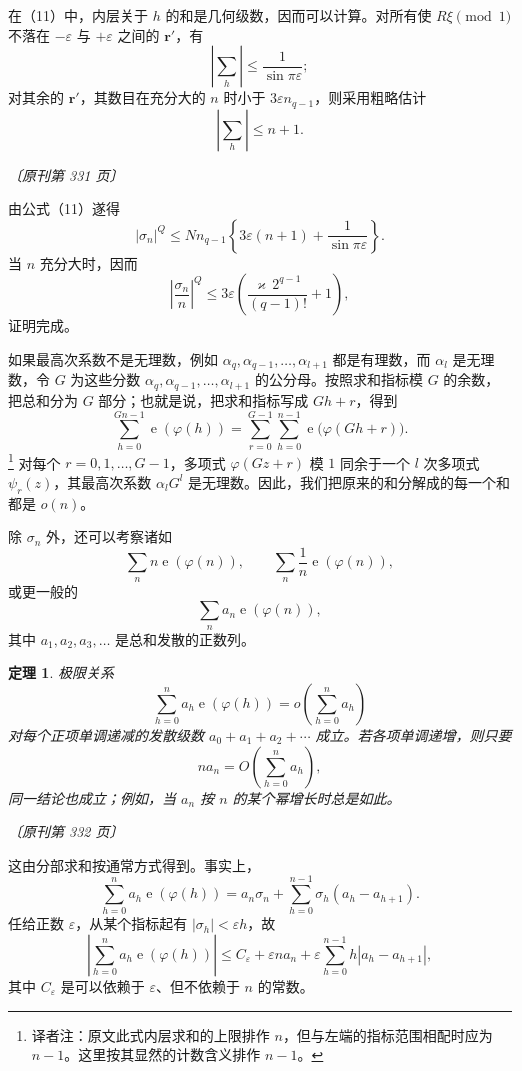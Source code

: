 \documentclass[UTF8,11pt,a4paper,fontset=none]{ctexart}
\theoremstyle{weylthm}
\newtheorem{theorem}{定理}
\newcommand{\e}{\operatorname{e}}
\newcommand{\origpage}[1]{%
  \par\vspace{0.7em}\noindent\hfill{\small\itshape〔原刊第 #1 页〕}\par\vspace{0.25em}}
\newcommand{\transnote}[1]{\footnote{译者注：#1}}
\begin{document}
在（11）中，内层关于 \(h\) 的和是几何级数，因而可以计算。对所有使
\(R\xi\pmod1\) 不落在 \(-\varepsilon\) 与 \(+\varepsilon\) 之间的
\(\mathbf r'\)，有
\[
 \left|\sum_h\right|\leq\frac1{\sin\pi\varepsilon};
\]
对其余的 \(\mathbf r'\)，其数目在充分大的 \(n\) 时小于
\(3\varepsilon n_{q-1}\)，则采用粗略估计
\[
 \left|\sum_h\right|\leq n+1.
\]

\origpage{331}

由公式（11）遂得
\[
 |\sigma_n|^Q
 \leq Nn_{q-1}
 \left\{3\varepsilon(n+1)+\frac1{\sin\pi\varepsilon}\right\}.
\]
当 \(n\) 充分大时，因而
\[
 \left|\frac{\sigma_n}{n}\right|^Q
 \leq 3\varepsilon
 \left(\frac{\varkappa\,2^{q-1}}{(q-1)!}+1\right),
\]
证明完成。

如果最高次系数不是无理数，例如
\(\alpha_q,\alpha_{q-1},\ldots,\alpha_{l+1}\) 都是有理数，而
\(\alpha_l\) 是无理数，令 \(G\) 为这些分数
\(\alpha_q,\alpha_{q-1},\ldots,\alpha_{l+1}\) 的公分母。按照求和指标模
\(G\) 的余数，把总和分为 \(G\) 部分；也就是说，把求和指标写成
\(Gh+r\)，得到
\[
 \sum_{h=0}^{Gn-1}\e(\varphi(h))
 =\sum_{r=0}^{G-1}\sum_{h=0}^{n-1}
   \e\bigl(\varphi(Gh+r)\bigr).
\]
\transnote{原文此式内层求和的上限排作 \(n\)，但与左端的指标范围相配时应为 \(n-1\)。这里按其显然的计数含义排作 \(n-1\)。}
对每个 \(r=0,1,\ldots,G-1\)，多项式 \(\varphi(Gz+r)\) 模 \(1\) 同余于一个
\(l\) 次多项式 \(\psi_r(z)\)，其最高次系数
\(\alpha_lG^l\) 是无理数。因此，我们把原来的和分解成的每一个和都是
\(o(n)\)。

除 \(\sigma_n\) 外，还可以考察诸如
\[
 \sum_n n\e(\varphi(n)),
 \qquad
 \sum_n\frac1n\e(\varphi(n)),
\]
或更一般的
\[
 \sum_n a_n\e(\varphi(n)),
\]
其中 \(a_1,a_2,a_3,\ldots\) 是总和发散的正数列。

\begin{theorem}
极限关系
\[
 \sum_{h=0}^{n}a_h\e(\varphi(h))
 =o\!\left(\sum_{h=0}^{n}a_h\right)
\]
对每个正项单调递减的发散级数
\(a_0+a_1+a_2+\cdots\) 成立。若各项单调递增，则只要
\[
 na_n=O\!\left(\sum_{h=0}^{n}a_h\right),
\]
同一结论也成立；例如，当 \(a_n\) 按 \(n\) 的某个幂增长时总是如此。
\end{theorem}

\origpage{332}

这由分部求和按通常方式得到。事实上，
\[
 \sum_{h=0}^{n}a_h\e(\varphi(h))
 =a_n\sigma_n+
 \sum_{h=0}^{n-1}\sigma_h(a_h-a_{h+1}).
\]
任给正数 \(\varepsilon\)，从某个指标起有
\(|\sigma_h|<\varepsilon h\)，故
\[
 \left|\sum_{h=0}^{n}a_h\e(\varphi(h))\right|
 \leq C_{\varepsilon}+\varepsilon na_n
 +\varepsilon\sum_{h=0}^{n-1}h|a_h-a_{h+1}|,
\]
其中 \(C_{\varepsilon}\) 是可以依赖于 \(\varepsilon\)、但不依赖于
\(n\) 的常数。
\end{document}
